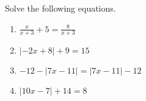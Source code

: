\documentclass{article}
\begin{document}
\HomeworkTitle[class={College Algebra}, number={1}, name={Linear Equations}]

Solve the following equations.

\begin{enumerate}
\item $\displaystyle\frac{x}{x + 3} + 5 = \displaystyle\frac{8}{x + 3}$ \vspace{5cm}

\item $|-2x + 8| + 9 = 15$ \vspace{5cm}

\item $-12 - |7x - 11| = |7x - 11| - 12$ \vspace{5cm}

\item $|10x - 7| + 14 = 8$
\end{enumerate}
\end{document}
